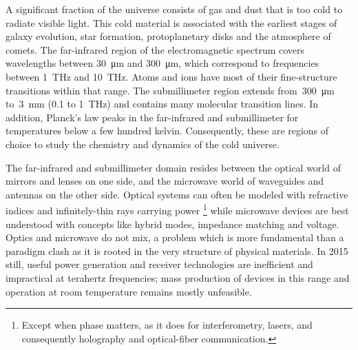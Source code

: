 A significant fraction of the universe consists of gas and dust that is too cold to radiate visible light.
This cold material is associated with the earliest stages of galaxy evolution, star formation, protoplanetary disks and the atmosphere of comets.
%
The far-infrared region of the electromagnetic spectrum covers wavelengths
between \SI{30}{\micro\meter} and \SI{300}{\micro\meter},
which correspond to frequencies
between \SI{1}{\tera\hertz} and \SI{10}{\tera\hertz}.
Atoms and ions have most of their fine-structure transitions within that range.
%
The submillimeter region extends from~\SI{300}{\micro\meter} to~\SI{3}{\milli\meter} (\num{0.1} to \SI{1}{\tera\hertz}) and contains many molecular transition lines.
%
In addition, Planck's law peaks in the far-infrared and submillimeter for temperatures below a few hundred kelvin.
%
Consequently, these are regions of choice to study the chemistry and dynamics of the cold universe.


The far-infrared and submillimeter domain resides between
the optical world of mirrors and lenses on one side,
and the microwave world of waveguides and antennas on the other side.
Optical systems can often be modeled with refractive indices and infinitely-thin rays carrying power%
\footnote{
    Except when phase matters, as it does for interferometry,
    lasers, and consequently holography and optical-fiber communication.
}
while microwave devices are best understood with concepts like hybrid modes, impedance matching and voltage.
Optics and microwave do not mix,
a problem which is more fundamental than a paradigm clash as it is rooted in the very structure of physical materials.
In 2015 still, useful power generation and receiver technologies are inefficient and impractical at terahertz frequencies;
mass production of devices in this range and operation at room temperature remains mostly unfeasible.

